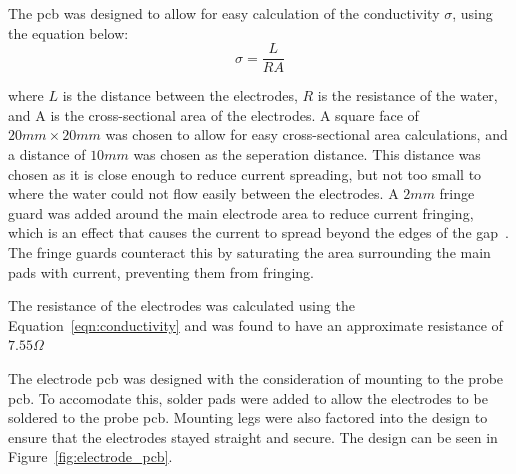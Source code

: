 The \gls{pcb} was designed to allow for easy calculation of the conductivity $\sigma$, using the equation below:
\begin{equation}\label{eqn:conductivity}
    \sigma = \frac{L}{RA}
\end{equation}

where $L$ is the distance between the electrodes, $R$ is the resistance of the water, and A is the cross-sectional area of the electrodes.
A square face of $20mm\times 20mm$ was chosen to allow for easy cross-sectional area calculations, and a distance of $10mm$ was chosen as the seperation distance.
This distance was chosen as it is close enough to reduce current spreading, but not too small to where the water could not flow easily between the electrodes.
A $2mm$ fringe guard was added around the main electrode area to reduce current fringing, which is an effect that causes the current to spread beyond the edges of the gap~\cite{roshen_fringing}.
The fringe guards counteract this by saturating the area surrounding the main pads with current, preventing them from fringing.

The resistance of the electrodes was calculated using the Equation~\ref{eqn:conductivity} and was found to have an approximate resistance of $7.55\Omega$

The electrode \gls{pcb} was designed with the consideration of mounting to the probe \gls{pcb}.
To accomodate this, solder pads were added to allow the electrodes to be soldered to the probe \gls{pcb}.
Mounting legs were also factored into the design to ensure that the electrodes stayed straight and secure.
The design can be seen in Figure~\ref{fig:electrode_pcb}.

